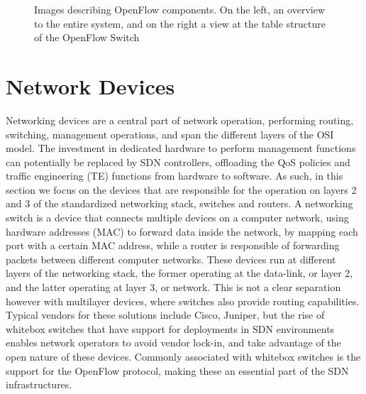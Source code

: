 \begin {enumerate}
\begin{figure} [h]
    \centering
    \begin{subfigure}
    \texttt{[image: sdn/open\_flow\_switch\_pipeline]}
    \end{subfigure}
    \begin{subfigure}
    \texttt{[image: sdn/open\_flow\_tables]}
    \end{subfigure}
    \caption{Images describing OpenFlow components. On the left, an overview to the entire system, and on the right a view at the table structure of the OpenFlow Switch}
\end{figure}

\section {Network Devices} 

Networking devices are a central part of network operation, performing routing, switching, management operations, and span the different layers of the OSI model. The investment in dedicated hardware to perform management functions can
potentially be replaced by SDN controllers, offloading the QoS policies and traffic engineering (TE) functions from hardware to software. As such, in this section we focus on the devices that are responsible for the operation on 
layers 2 and 3 of the standardized networking stack, switches and routers. A networking switch is a device that connects multiple devices on a computer network, using hardware addresses (MAC) to forward data inside the network, 
by mapping each port with a certain MAC address, while a router is responsible of forwarding packets between different computer networks. These devices run at different layers of the networking stack, the former operating at the 
data-link, or layer 2, and the latter operating at layer 3, or network. This is not a clear separation however with multilayer devices, where switches also provide routing capabilities. Typical vendors for these solutions include
Cisco, Juniper, but the rise of whitebox switches that have support for deployments in SDN environments enables network operators to avoid vendor lock-in, and take advantage of the open nature of these devices. Commonly associated 
with whitebox switches is the support for the OpenFlow protocol, making these an essential part of the SDN infrastructures.


\end{enumerate}
